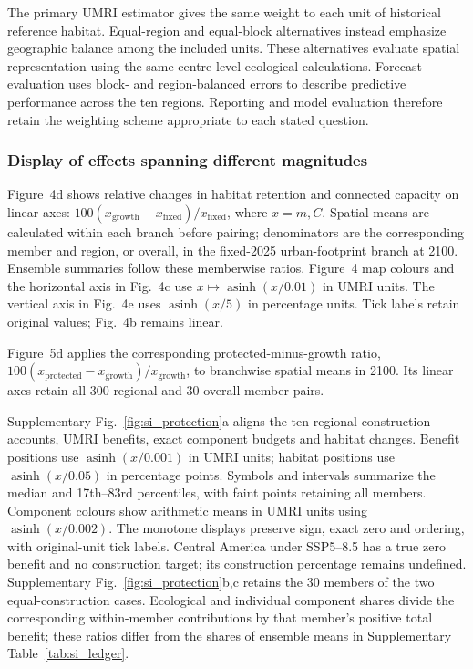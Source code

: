 The primary UMRI estimator gives the same weight to each unit of historical reference habitat. Equal-region and equal-block alternatives instead emphasize geographic balance among the included units. These alternatives evaluate spatial representation using the same centre-level ecological calculations. Forecast evaluation uses block- and region-balanced errors to describe predictive performance across the ten regions. Reporting and model evaluation therefore retain the weighting scheme appropriate to each stated question.

\subsubsection{Display of effects spanning different magnitudes}
Figure~4d shows relative changes in habitat retention and connected capacity on linear axes: $100(x_{\mathrm{growth}}-x_{\mathrm{fixed}})/x_{\mathrm{fixed}}$, where $x=m,C$. Spatial means are calculated within each branch before pairing; denominators are the corresponding member and region, or overall, in the fixed-2025 urban-footprint branch at 2100. Ensemble summaries follow these memberwise ratios. Figure~4 map colours and the horizontal axis in Fig.~4c use $x\mapsto\operatorname{asinh}(x/0.01)$ in UMRI units. The vertical axis in Fig.~4e uses $\operatorname{asinh}(x/5)$ in percentage units. Tick labels retain original values; Fig.~4b remains linear.

Figure~5d applies the corresponding protected-minus-growth ratio, $100(x_{\mathrm{protected}}-x_{\mathrm{growth}})/x_{\mathrm{growth}}$, to branchwise spatial means in 2100. Its linear axes retain all 300 regional and 30 overall member pairs.

Supplementary Fig.~\ref{fig:si_protection}a aligns the ten regional construction accounts, UMRI benefits, exact component budgets and habitat changes. Benefit positions use $\operatorname{asinh}(x/0.001)$ in UMRI units; habitat positions use $\operatorname{asinh}(x/0.05)$ in percentage points. Symbols and intervals summarize the median and 17th--83rd percentiles, with faint points retaining all members. Component colours show arithmetic means in UMRI units using $\operatorname{asinh}(x/0.002)$. The monotone displays preserve sign, exact zero and ordering, with original-unit tick labels. Central America under SSP5--8.5 has a true zero benefit and no construction target; its construction percentage remains undefined. Supplementary Fig.~\ref{fig:si_protection}b,c retains the 30 members of the two equal-construction cases. Ecological and individual component shares divide the corresponding within-member contributions by that member's positive total benefit; these ratios differ from the shares of ensemble means in Supplementary Table~\ref{tab:si_ledger}.


